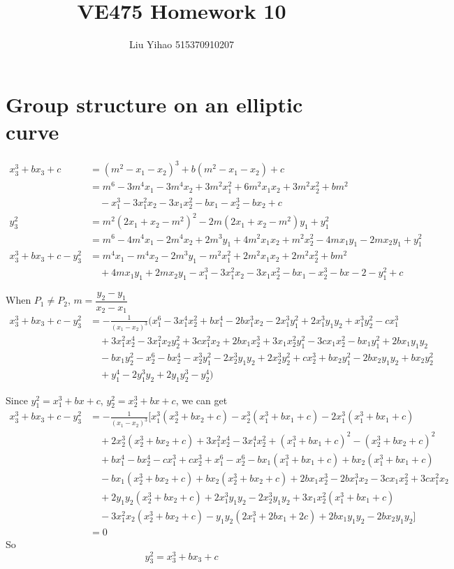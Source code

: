 \documentclass{article}
\title{VE475 Homework 10}
\author{Liu Yihao 515370910207}
\date{}
\begin{document}
\maketitle

\section{Group structure on an elliptic curve}
\begin{align*}
x_3^3+bx_3+c&=(m^2-x_1-x_2)^3+b(m^2-x_1-x_2)+c\\
&=m^6-3m^4x_1-3m^4x_2+3m^2x_1^2+6m^2x_1x_2+3m^2x_2^2+bm^2\\
&\quad-x_1^3-3x_1^2x_2-3x_1x_2^2-bx_1-x_2^3-bx_2+c\\
y_3^2&=m^2(2x_1+x_2-m^2)^2-2m(2x_1+x_2-m^2)y_1+y_1^2\\
&=m^6-4m^4x_1-2m^4x_2+2m^3y_1+4m^2x_1x_2+m^2x_2^2-4mx_1y_1-2mx_2y_1
+y_1^2\\
x_3^3+bx_3+c-y_3^2&=m^4x_1-m^4x_2-2m^3y_1-m^2x_1^2+2m^2x_1x_2+2m^2x_2^2+bm^2\\
&\quad+4mx_1y_1+2mx_2y_1-x_1^3-3x_1^2x_2-3x_1x_2^2-bx_1-x_2^3-bx-2-y_1^2+c
\end{align*}

When $P_1\neq P_2$, $m=\dfrac{y_2-y_1}{x_2-x_1}$
\begin{align*}
x_3^3+bx_3+c-y_3^2&=
-\frac{1}{(x_1-x_2)^3}(x_1^6 - 3x_1^4x_2^2 + bx_1^4 - 2bx_1^3x_2 - 2x_1^3y_1^2 + 2x_1^3y_1y_2 + x_1^3y_2^2 - cx_1^3 \\
&\quad + 3x_1^2x_2^4 - 3x_1^2x_2y_2^2 + 3cx_1^2x_2 + 2bx_1x_2^3 + 3x_1x_2^2y_1^2 - 3cx_1x_2^2 - bx_1y_1^2 + 2bx_1y_1y_2 \\
&\quad  - bx_1y_2^2- x_2^6 - bx_2^4 - x_2^3y_1^2 - 2x_2^3y_1y_2 + 2x_2^3y_2^2 + cx_2^3 + bx_2y_1^2 - 2bx_2y_1y_2 + bx_2y_2^2 \\
&\quad + y_1^4 - 2y_1^3y_2 + 2y_1y_2^3 - y_2^4)
\end{align*}

Since $y_1^2=x_1^3+bx+c$, $y_2^2=x_2^3+bx+c$, we can get
\begin{align*}
x_3^3+bx_3+c-y_3^2&=-\frac{1}{(x_1-x_2)^3}[
x_1^3(x_2^3 + bx_2 + c) - x_2^3(x_1^3 + bx_1 + c) - 2x_1^3(x_1^3 + bx_1 + c)\\
&\quad + 2x_2^3(x_2^3 + bx_2 + c) + 3x_1^2x_2^4 - 3x_1^4x_2^2 + (x_1^3 + bx_1 + c)^2 - (x_2^3 + bx_2 + c)^2\\
&\quad + bx_1^4 - bx_2^4 - cx_1^3 + cx_2^3 + x_1^6 - x_2^6 - bx_1(x_1^3 + bx_1 + c) + bx_2(x_1^3 + bx_1 + c)\\
&\quad - bx_1(x_2^3 + bx_2 + c) + bx_2(x_2^3 + bx_2 + c) + 2bx_1x_2^3 - 2bx_1^3x_2 - 3cx_1x_2^2 + 3cx_1^2x_2\\
&\quad + 2y_1y_2(x_2^3 + bx_2 + c) + 2x_1^3y_1y_2 - 2x_2^3y_1y_2 + 3x_1x_2^2(x_1^3 + bx_1 + c)\\
&\quad - 3x_1^2x_2(x_2^3 + bx_2 + c) - y_1y_2(2x_1^3 + 2bx_1 + 2c) + 2bx_1y_1y_2 - 2bx_2y_1y_2]\\
&=0
\end{align*}
So $$y_3^2=x^3_3+bx_3+c$$ \\
\end{document}
